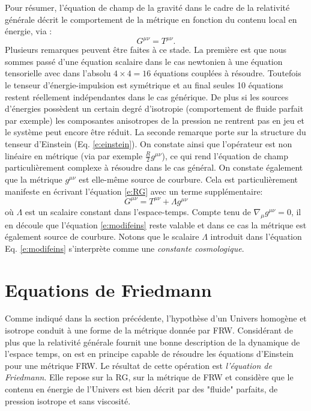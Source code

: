 Pour résumer, l'équation de champ de la gravité dans le cadre de la relativité générale décrit le comportement de la métrique en fonction du contenu local en énergie, via :
\begin{equation}
G^{\mu\nu}=T^{\mu\nu}.
\label{e:RG}
\end{equation}
Plusieurs remarques peuvent être faites à ce stade. La première est que nous sommes passé d'une équation scalaire dans le cas newtonien à une équation tensorielle avec dans l'absolu $ 4\times 4=16$ équations couplées à résoudre. Toutefois le tenseur d'énergie-impulsion est symétrique et au final seules 10 équations restent réellement indépendantes dans le cas générique. De plus si les sources d'énergies possèdent un certain degré d'isotropie (comportement de fluide parfait par exemple) les composantes anisotropes de la pression ne rentrent pas en jeu et le système peut encore être réduit. La seconde remarque porte sur la structure du tenseur d'Einstein (Eq. \ref{e:einstein}). On constate ainsi que l'opérateur est non linéaire  en métrique (via par exemple $\frac{R}{2}g^{\mu\nu}$), ce qui rend l'équation de champ particulièrement complexe à résoudre dans le cas général. On constate également que la métrique $g^{\mu\nu}$ est elle-même source de courbure. Cela est particulièrement manifeste en écrivant l'équation \ref{e:RG} avec un terme supplémentaire:
\begin{equation}
G^{\mu\nu}=T^{\mu\nu}+\Lambda g^{\mu\nu}
\label{e:modifeins}
\end{equation}
où $\Lambda$ est un scalaire constant dans l'espace-temps. Compte tenu de $\nabla_\mu g^{\mu \nu}=0$, il en découle que l'équation \ref{e:modifeins} reste valable et dans ce cas  la métrique est également source de courbure. Notons que le scalaire $\Lambda$ introduit dans l'équation Eq. \ref{e:modifeins} s'interprète comme une \textit{constante cosmologique}.

\section{Equations de Friedmann}
Comme indiqué dans la section précédente, l'hypothèse d'un Univers homogène et isotrope conduit à une forme de la métrique donnée par FRW. Considérant de plus que la relativité générale fournit une bonne description de la dynamique de l'espace temps, on est en principe capable de résoudre les équations d'Einstein pour une métrique FRW. Le résultat de cette opération est \textit{l'équation de Friedmann}. Elle repose sur la RG, sur la métrique de FRW et considère que le contenu en énergie de l'Univers est bien décrit par des "fluide" parfaits, de pression isotrope et sans viscosité.

